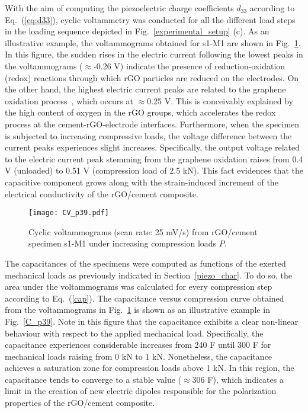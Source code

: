 \documentclass[a4paper,fleqn]{cas-sc}
\begin{document}
With the aim of computing the piezoelectric charge coefficients $d_{33}$ according to Eq.~(\ref{eq:d33}), cyclic voltammetry was conducted for all the different load steps in the loading sequence depicted in Fig.~\ref{experimental_setup} (c). As an illustrative example, the voltammograms obtained for s1-M1 are shown in Fig.~\ref{voltamp_p39}. In this figure, the sudden rises in the electric current following the lowest peaks in the voltammograms ($\approx$-0.26 V) indicate the presence of reduction-oxidation (redox) reactions through which rGO particles are reduced on the electrodes. On the other hand, the highest electric current peaks are related to the graphene oxidation process~\cite{KAUPPILA201384}, which occurs at $\approx$0.25 V. This is conceivably explained by the high content of oxygen in the rGO groups, which accelerates the redox process at the cement-rGO-electrode interfaces. Furthermore, when the specimen is subjected to increasing compressive loads, the voltage difference between the current peaks experiences slight increases. Specifically, the output voltage related to the electric current peak stemming from the graphene oxidation raises from 0.4 V (unloaded) to 0.51 V (compression load of 2.5 kN). This fact evidences that the capacitive component grows along with the strain-induced increment of the electrical conductivity of the rGO/cement composite.

\begin{figure}[ht]
    \centering
    \texttt{[image: CV\_p39.pdf]}
    \caption{Cyclic voltammograms (scan rate: 25 mV/s) from rGO/cement specimen s1-M1 under increasing compression loads $P$.}
    \label{voltamp_p39}
\end{figure}

The capacitances of the specimens were computed as functions of the exerted mechanical loads as previously indicated in Section~\ref{piezo_char}. To do so, the area under the voltammograms was calculated for every compression step according to Eq.~(\ref{cap}). The capacitance versus compression curve obtained from the voltammograms in Fig.~\ref{voltamp_p39} is shown as an illustrative example in Fig.~\ref{C_p39}. Note in this figure that the capacitance exhibits a clear non-linear behaviour with respect to the applied mechanical load. Specifically, the capacitance experiences considerable increases from 240 {\textmu}F until 300 {\textmu}F for mechanical loads raising from 0 kN to 1 kN. Nonetheless, the capacitance achieves a saturation zone for compression loads above 1 kN. In this region, the capacitance tends to converge to a stable value ($\approx$306 {\textmu}F), which indicates a limit in the creation of new electric dipoles responsible for the polarization properties of the rGO/cement composite. 
\end{document}
